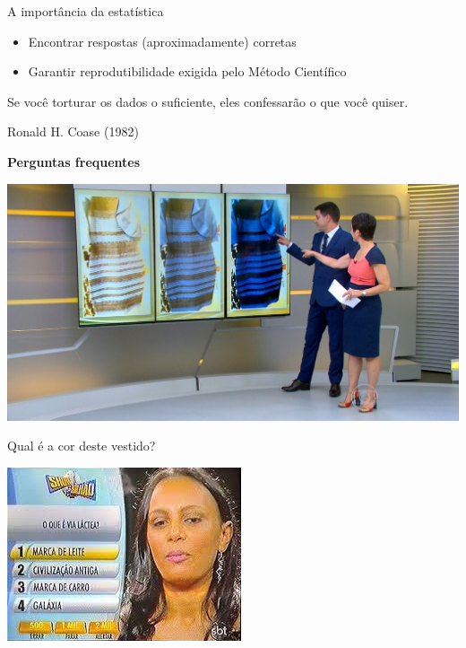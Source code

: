 \documentclass{beamer}
\begin{document}
\begin{frame}{A importância da estatística}
  \begin{itemize}
  \item Encontrar respostas (aproximadamente) corretas
  \item Garantir reprodutibilidade exigida pelo Método Científico
  \end{itemize}
\end{frame}

\begin{frame}{}
  \begin{block}{}
    Se você torturar os dados o suficiente, eles confessarão o que você quiser.
  \end{block}
\hfill Ronald H. Coase (1982)
\end{frame}

\begin{frame}
  \begin{center}
    {\bf Perguntas frequentes}
  \end{center}
\end{frame}

\begin{frame}
  \begin{center}
    \includegraphics[width=\textwidth]{Imagens/pergunta1}

    Qual é a cor deste vestido?
  \end{center}
\end{frame}

\begin{frame}
  \begin{center}
    \includegraphics[width=.7\textwidth]{Imagens/pergunta2}
  \end{center}
\end{frame}
\end{document}
